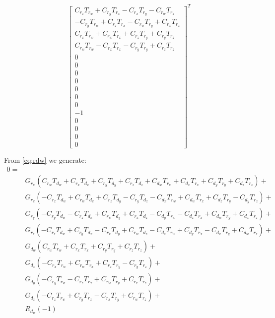 \documentclass[12pt]{article}
\begin{document}
	   \begin{equation}
	       \begin{bmatrix}
	       C_{r_z} T_{r_w}+C_{r_y} T_{r_x}-C_{r_x} T_{r_y}-C_{r_w} T_{r_z}\\
	       -C_{r_y} T_{r_w}+C_{r_z} T_{r_x}-C_{r_w} T_{r_y}+C_{r_x} T_{r_z}\\
	       C_{r_x} T_{r_w}+C_{r_w} T_{r_x}+C_{r_z} T_{r_y}+C_{r_y} T_{r_z}\\
	       C_{r_w} T_{r_w}-C_{r_x} T_{r_x}-C_{r_y} T_{r_y}+C_{r_z} T_{r_z}\\
	       0 \\ 0 \\ 0 \\ 0 \\ 0 \\ 0 \\ 0 \\ -1 \\ 0 \\ 0 \\ 0 \\ 0
	        \end{bmatrix}^T
	    \end{equation}
	    
From \autoref{eq:rdw} we generate:
\begin{equation}
    \begin{split}
0= \\&
G_{r_w} (C_{r_w} T_{d_w}+C_{r_x} T_{d_x}+C_{r_y} T_{d_y}+C_{r_z} T_{d_z}+C_{d_w} T_{r_w}+C_{d_x} T_{r_x}+C_{d_y} T_{r_y}+C_{d_z} T_{r_z})+\\&
G_{r_x} (-C_{r_x} T_{d_w}+C_{r_w} T_{d_x}+C_{r_z} T_{d_y}-C_{r_y} T_{d_z}-C_{d_x} T_{r_w}+C_{d_w} T_{r_x}+C_{d_z} T_{r_y}-C_{d_y} T_{r_z})+\\&
G_{r_y} (-C_{r_y} T_{d_w}-C_{r_z} T_{d_x}+C_{r_w} T_{d_y}+C_{r_x} T_{d_z}-C_{d_y} T_{r_w}-C_{d_z} T_{r_x}+C_{d_w} T_{r_y}+C_{d_x} T_{r_z})+\\&
G_{r_z} (-C_{r_z} T_{d_w}+C_{r_y} T_{d_x}-C_{r_x} T_{d_y}+C_{r_w} T_{d_z}-C_{d_z} T_{r_w}+C_{d_y} T_{r_x}-C_{d_x} T_{r_y}+C_{d_w} T_{r_z})+\\&
G_{d_w} (C_{r_w} T_{r_w}+C_{r_x} T_{r_x}+C_{r_y} T_{r_y}+C_{r_z} T_{r_z})+\\&
G_{d_x} (-C_{r_x} T_{r_w}+C_{r_w} T_{r_x}+C_{r_z} T_{r_y}-C_{r_y} T_{r_z})+\\&
G_{d_y} (-C_{r_y} T_{r_w}-C_{r_z} T_{r_x}+C_{r_w} T_{r_y}+C_{r_x} T_{r_z})+\\&
G_{d_z} (-C_{r_z} T_{r_w}+C_{r_y} T_{r_x}-C_{r_x} T_{r_y}+C_{r_w} T_{r_z})+\\&
 R_{d_w}(-1)
 \end{split}
 \end{equation}
\end{document}
